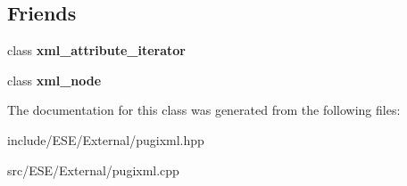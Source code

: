 \subsection*{Friends}
\begin{DoxyCompactItemize}
\item 
\hypertarget{classpugi_1_1xml__attribute_aeff34dec57ee910e3344631528969539}{class {\bfseries xml\-\_\-attribute\-\_\-iterator}}\label{classpugi_1_1xml__attribute_aeff34dec57ee910e3344631528969539}

\item 
\hypertarget{classpugi_1_1xml__attribute_a156d917a92815c7b593bd5ef19f6d5fb}{class {\bfseries xml\-\_\-node}}\label{classpugi_1_1xml__attribute_a156d917a92815c7b593bd5ef19f6d5fb}

\end{DoxyCompactItemize}


The documentation for this class was generated from the following files\-:\begin{DoxyCompactItemize}
\item 
include/\-E\-S\-E/\-External/pugixml.\-hpp\item 
src/\-E\-S\-E/\-External/pugixml.\-cpp\end{DoxyCompactItemize}
